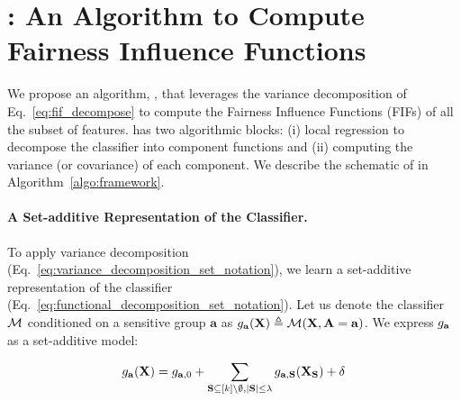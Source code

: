 \section{\fairXplainer: An Algorithm to Compute Fairness Influence Functions}\label{sec:fairxplainer}
\begin{comment}
Represent the algorithm as a sequence of two blocks: (1) Component function learning (2) Covariance computation of component functions. 
\end{comment}
We propose an algorithm, {\fairXplainer}, that leverages the variance decomposition of Eq.~\eqref{eq:fif_decompose} to compute the Fairness Influence Functions (FIFs) of all the subset of features. {\fairXplainer} has two algorithmic blocks: (i) local regression to decompose the classifier into component functions and (ii) computing the variance (or covariance) of each component. We describe the schematic of \fairXplainer{} in Algorithm~\ref{algo:framework}.
\setlength{\textfloatsep}{12pt}%

\paragraph{A Set-additive Representation of the Classifier.} To apply variance decomposition (Eq.~\eqref{eq:variance_decomposition_set_notation}), we learn a set-additive representation of the classifier (Eq.~\eqref{eq:functional_decomposition_set_notation}). Let us denote the classifier $ \mathcal{M} $ conditioned on a sensitive group $ \mathbf{a} $ as $ g_{\mathbf{a}}(\mathbf{X}) \triangleq \mathcal{M}(\mathbf{X}, \mathbf{A} = \mathbf{a}) $. We express $ g_{\mathbf{a}} $ as a set-additive model:

\begin{align}
\label{eq:set_additive_classifier}
g_{\mathbf{a}}(\mathbf{X}) = g_{\mathbf{a}, 0} +  \sum_{\mathbf{S} \subseteq [k] \setminus \emptyset, |\mathbf{S}| \le \lambda} g_{\mathbf{a},\mathbf{S}}(\mathbf{X}_{\mathbf{S}}) + \delta
\end{align}

